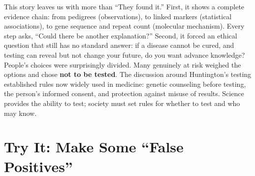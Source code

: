 \begin{zhengju}
This story leaves us with more than ``They found it.'' First, it shows a complete evidence chain: from pedigrees (observations), to linked markers (statistical associations), to gene sequence and repeat count (molecular mechanism). Every step asks, ``Could there be another explanation?'' Second, it forced an ethical question that still has no standard answer: if a disease cannot be cured, and testing can reveal but not change your future, do you want advance knowledge? People's choices were surprisingly divided. Many genuinely at risk weighed the options and chose \textbf{not to be tested}. The discussion around Huntington's testing established rules now widely used in medicine: genetic counseling before testing, the person's informed consent, and protection against misuse of results. Science provides the ability to test; society must set rules for whether to test and who may know.
\end{zhengju}

\section{Try It: Make Some ``False Positives''}


